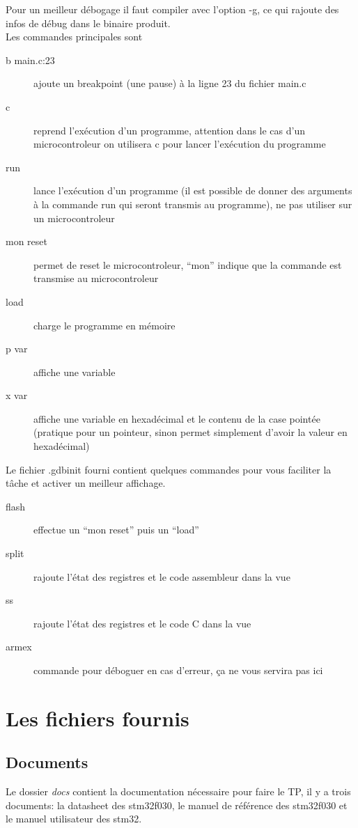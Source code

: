 \documentclass[a4paper,10pt]{article} %
\begin{document}
Pour un meilleur débogage il faut compiler avec l'option -g, ce qui rajoute des infos de débug dans le binaire produit.\\

Les commandes principales sont
\begin{description}
    \item[b main.c:23] ajoute un breakpoint (une pause) à la ligne 23 du fichier main.c
    \item[c] reprend l’exécution d'un programme, attention dans le cas d'un microcontroleur on utilisera c pour lancer l’exécution du programme
    \item[run] lance l’exécution d'un programme (il est possible de donner des arguments à la commande run qui seront transmis au programme), ne pas utiliser sur un microcontroleur
    \item[mon reset] permet de reset le microcontroleur, ``mon'' indique que la commande est transmise au microcontroleur
    \item[load] charge le programme en mémoire
    \item[p var] affiche une variable
    \item[x var] affiche une variable en hexadécimal et le contenu de la case pointée (pratique pour un pointeur, sinon permet simplement d'avoir la valeur en hexadécimal)
\end{description}

\bigskip
Le fichier .gdbinit fourni contient quelques commandes pour vous faciliter la tâche et activer un meilleur affichage.

\begin{description}
    \item[flash] effectue un ``mon reset'' puis un ``load''
    \item[split] rajoute l'état des registres et le code assembleur dans la vue
    \item[ss] rajoute l'état des registres et le code C dans la vue
    \item[armex] commande pour déboguer en cas d'erreur, ça ne vous servira pas ici
\end{description}

\section{\label{fichiers_fournis}Les fichiers fournis}
\subsection{Documents}
Le dossier \textit{docs} contient la documentation nécessaire pour faire le TP, il y a trois documents: la datasheet des stm32f030, le manuel de référence des stm32f030 et le manuel utilisateur des stm32.\\
\end{document}

